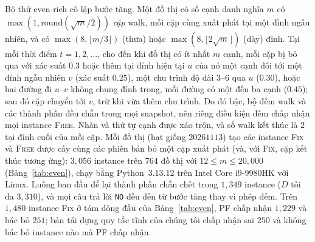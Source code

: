 \documentclass[pdflatex,sn-mathphys-num]{sn-jnl}
\theoremstyle{thmstyleone}
\theoremstyle{thmstyletwo}
\theoremstyle{thmstylethree}
\newcommand{\FIX}{\textup{\textsc{Fix}}}
\newcommand{\FREE}{\textup{\textsc{Free}}}
\newcommand{\NO}{\texttt{NO}}
\begin{document}
Bộ thử even-rich cô lập bước tăng. Một đồ thị có số cạnh danh nghĩa $m$ có $\max(1,\mathrm{round}(\sqrt m/2))$ \emph{cặp} walk, mỗi cặp cùng xuất phát tại một đỉnh ngẫu nhiên, và có $\max(8,\lfloor m/3\rfloor)$ (thưa) hoặc $\max(8,\lfloor 2\sqrt m\rfloor)$ (dày) đỉnh. Tại mỗi thời điểm $t=1,2,\dots$, cho đến khi đồ thị có ít nhất $m$ cạnh, mỗi cặp bị bỏ qua với xác suất $0.3$ hoặc thêm tại đỉnh hiện tại $u$ của nó một cạnh đôi tới một đỉnh ngẫu nhiên $v$ (xác suất $0.25$), một chu trình độ dài $3$--$6$ qua $u$ ($0.30$), hoặc hai đường đi $u$--$v$ không chung đỉnh trong, mỗi đường có một đến ba cạnh ($0.45$); sau đó cặp chuyển tới $v$, trừ khi vừa thêm chu trình. Do đó bậc, bộ đếm walk và các thành phần đều chẵn trong mọi snapshot, nên riêng điều kiện đếm chấp nhận mọi instance \FREE{}. Nhãn và thứ tự cạnh được xáo trộn, và số walk kết thúc là $2$ tại đỉnh cuối của mỗi cặp. Mỗi đồ thị (hạt giống $20261113$) tạo các instance \FIX{} và \FREE{} được cấy cùng các phiên bản bỏ một cặp xuất phát (và, với \FIX{}, cặp kết thúc tương ứng): $3{,}056$ instance trên $764$ đồ thị với $12\le m\le20{,}000$ (Bảng~\ref{tab:even}), chạy bằng Python~3.13.12 trên Intel Core i9-9980HK với Linux. Luồng ban đầu để lại thành phần chẵn chết trong $1{,}349$ instance ($D$ tối đa $3{,}310$), và mọi câu trả lời \NO{} đều đến từ bước tăng thay vì phép đếm. Trên $1{,}480$ instance \FIX{} ở tám dòng đầu của Bảng~\ref{tab:even}, PF chấp nhận $1{,}229$ và bác bỏ $251$; bản tái dựng quy tắc tĩnh của chúng tôi chấp nhận sai $250$ và không bác bỏ instance nào mà PF chấp nhận.
\end{document}
